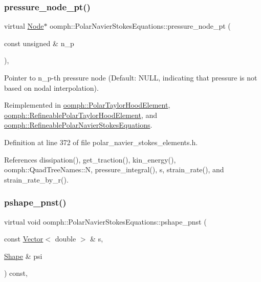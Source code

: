 \subsubsection{\texorpdfstring{pressure\+\_\+node\+\_\+pt()}{pressure\_node\_pt()}}
{\footnotesize\ttfamily virtual \hyperlink{classoomph_1_1Node}{Node}$\ast$ oomph\+::\+Polar\+Navier\+Stokes\+Equations\+::pressure\+\_\+node\+\_\+pt (\begin{DoxyParamCaption}\item[{const unsigned \&}]{n\+\_\+p }\end{DoxyParamCaption})\hspace{0.3cm}{\ttfamily [inline]}, {\ttfamily [virtual]}}



Pointer to n\+\_\+p-\/th pressure node (Default\+: N\+U\+LL, indicating that pressure is not based on nodal interpolation). 



Reimplemented in \hyperlink{classoomph_1_1PolarTaylorHoodElement_a8843c94923e754967be8765c77d8c0a0}{oomph\+::\+Polar\+Taylor\+Hood\+Element}, \hyperlink{classoomph_1_1RefineablePolarTaylorHoodElement_a327a296af13c5c7346fdfd06b4da7bd8}{oomph\+::\+Refineable\+Polar\+Taylor\+Hood\+Element}, and \hyperlink{classoomph_1_1RefineablePolarNavierStokesEquations_a83ec74f6d0ecc0b120149a1dad682486}{oomph\+::\+Refineable\+Polar\+Navier\+Stokes\+Equations}.



Definition at line 372 of file polar\+\_\+navier\+\_\+stokes\+\_\+elements.\+h.



References dissipation(), get\+\_\+traction(), kin\+\_\+energy(), oomph\+::\+Quad\+Tree\+Names\+::N, pressure\+\_\+integral(), s, strain\+\_\+rate(), and strain\+\_\+rate\+\_\+by\+\_\+r().

\mbox{\label{classoomph_1_1PolarNavierStokesEquations_a1b382bf38d7b7041417bbc91ad85b38f}} 
\subsubsection{\texorpdfstring{pshape\+\_\+pnst()}{pshape\_pnst()}\hspace{0.1cm}{\footnotesize\ttfamily [1/2]}}
{\footnotesize\ttfamily virtual void oomph\+::\+Polar\+Navier\+Stokes\+Equations\+::pshape\+\_\+pnst (\begin{DoxyParamCaption}\item[{const \hyperlink{classoomph_1_1Vector}{Vector}$<$ double $>$ \&}]{s,  }\item[{\hyperlink{classoomph_1_1Shape}{Shape} \&}]{psi }\end{DoxyParamCaption}) const\hspace{0.3cm}{\ttfamily [protected]}, {}}




